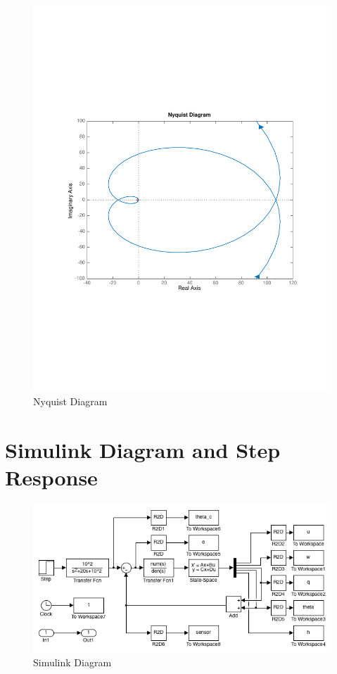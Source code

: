 \documentclass[12pt]{article}
\begin{document}
\begin{figure}[h]
\begin{center}
\includegraphics[width=1\textwidth]{figures/nyquist}
\caption{Nyquist Diagram}
\end{center}
\end{figure}

\clearpage
\section{Simulink Diagram and Step Response}
\begin{figure}[h]
\begin{center}
\includegraphics[width=1\textwidth]{figures/simulink}
\caption{Simulink Diagram}
\end{center}
\end{figure}
\end{document}
